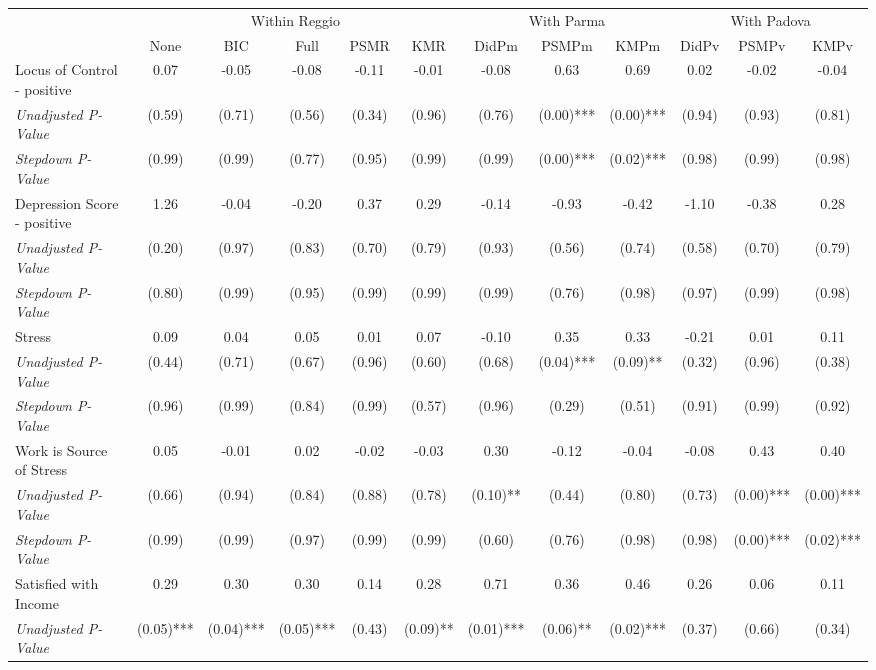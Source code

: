 \begin{tabular}{l c c c c c c c c c c c}
\toprule
& \multicolumn{5}{c}{Within Reggio} & \multicolumn{3}{c}{With Parma} & \multicolumn{3}{c}{With Padova} \\\cmidrule(lr){2-6} \cmidrule(lr){7-9} \cmidrule(lr){10-12}
 & None & BIC & Full & PSMR & KMR & DidPm & PSMPm & KMPm & DidPv & PSMPv & KMPv \\
\midrule
Locus of Control - positive & 0.07 & -0.05 & -0.08 & -0.11 & -0.01 & -0.08 & 0.63 & 0.69 & 0.02 & -0.02 & -0.04 \\
\quad \textit{Unadjusted P-Value} & (0.59) & (0.71) & (0.56) & (0.34) & (0.96) & (0.76) & (0.00)*** & (0.00)*** & (0.94) & (0.93) & (0.81) \\
\quad \textit{Stepdown P-Value} & (0.99) & (0.99) & (0.77) & (0.95) & (0.99) & (0.99) & (0.00)*** & (0.02)*** & (0.98) & (0.99) & (0.98) \\
Depression Score - positive & 1.26 & -0.04 & -0.20 & 0.37 & 0.29 & -0.14 & -0.93 & -0.42 & -1.10 & -0.38 & 0.28 \\
\quad \textit{Unadjusted P-Value} & (0.20) & (0.97) & (0.83) & (0.70) & (0.79) & (0.93) & (0.56) & (0.74) & (0.58) & (0.70) & (0.79) \\
\quad \textit{Stepdown P-Value} & (0.80) & (0.99) & (0.95) & (0.99) & (0.99) & (0.99) & (0.76) & (0.98) & (0.97) & (0.99) & (0.98) \\
Stress & 0.09 & 0.04 & 0.05 & 0.01 & 0.07 & -0.10 & 0.35 & 0.33 & -0.21 & 0.01 & 0.11 \\
\quad \textit{Unadjusted P-Value} & (0.44) & (0.71) & (0.67) & (0.96) & (0.60) & (0.68) & (0.04)*** & (0.09)** & (0.32) & (0.96) & (0.38) \\
\quad \textit{Stepdown P-Value} & (0.96) & (0.99) & (0.84) & (0.99) & (0.57) & (0.96) & (0.29) & (0.51) & (0.91) & (0.99) & (0.92) \\
Work is Source of Stress & 0.05 & -0.01 & 0.02 & -0.02 & -0.03 & 0.30 & -0.12 & -0.04 & -0.08 & 0.43 & 0.40 \\
\quad \textit{Unadjusted P-Value} & (0.66) & (0.94) & (0.84) & (0.88) & (0.78) & (0.10)** & (0.44) & (0.80) & (0.73) & (0.00)*** & (0.00)*** \\
\quad \textit{Stepdown P-Value} & (0.99) & (0.99) & (0.97) & (0.99) & (0.99) & (0.60) & (0.76) & (0.98) & (0.98) & (0.00)*** & (0.02)*** \\
Satisfied with Income & 0.29 & 0.30 & 0.30 & 0.14 & 0.28 & 0.71 & 0.36 & 0.46 & 0.26 & 0.06 & 0.11 \\
\quad \textit{Unadjusted P-Value} & (0.05)*** & (0.04)*** & (0.05)*** & (0.43) & (0.09)** & (0.01)*** & (0.06)** & (0.02)*** & (0.37) & (0.66) & (0.34) \\

\end{tabular}
